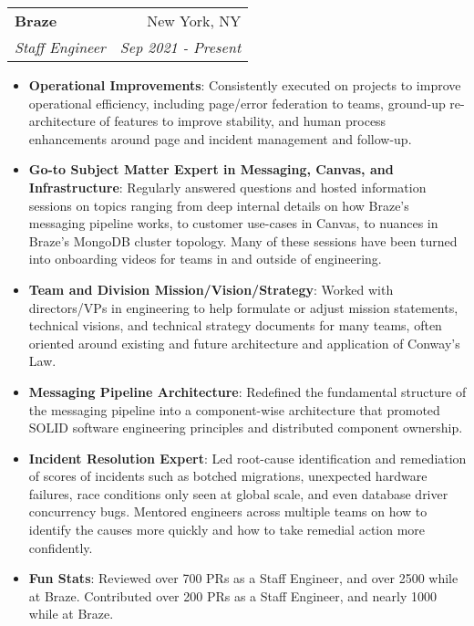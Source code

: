 \documentclass[letterpaper,10pt]{article}
\makeatletter
\newcommand{\resumeItem}[2]{
  \item\small{
    \textbf{#1}{: #2 \vspace{-2pt}}
  }
}
\newcommand{\resumeSubheading}[4]{
  \vspace{-1pt}\item
    \begin{tabular*}{0.97\textwidth}[t]{l@{\extracolsep{\fill}}r}
      \textbf{#1} & #2 \\
      \textit{\small#3} & \textit{\small #4} \\
    \end{tabular*}\vspace{-5pt}
}
\newcommand{\resumeItemListStart}{\begin{itemize}}
\newcommand{\resumeItemListEnd}{\end{itemize}\vspace{-5pt}}
\makeatother
\begin{document}
    \resumeSubheading
      {Braze}{New York, NY}
      {Staff Engineer}{Sep 2021 - Present}
       \resumeItemListStart
        \resumeItem{Operational Improvements}
          {Consistently executed on projects to improve operational efficiency, including page/error federation to teams, ground-up re-architecture of features to improve stability, and human process enhancements around page and incident management and follow-up.}
        \resumeItem{Go-to Subject Matter Expert in Messaging, Canvas, and Infrastructure}
          {Regularly answered questions and hosted information sessions on topics ranging from deep internal details on how Braze's messaging pipeline works, to customer use-cases in Canvas, to nuances in Braze's MongoDB cluster topology. Many of these sessions have been turned into onboarding videos for teams in and outside of engineering.}
        \resumeItem{Team and Division Mission/Vision/Strategy}
          {Worked with directors/VPs in engineering to help formulate or adjust mission statements, technical visions, and technical strategy documents for many teams, often oriented around existing and future architecture and application of Conway's Law.}
        \resumeItem{Messaging Pipeline Architecture}
          {Redefined the fundamental structure of the messaging pipeline into a component-wise architecture that promoted SOLID software engineering principles and distributed component ownership.}
        \resumeItem{Incident Resolution Expert}
          {Led root-cause identification and remediation of scores of incidents such as botched migrations, unexpected hardware failures, race conditions only seen at global scale, and even database driver concurrency bugs. Mentored engineers across multiple teams on how to identify the causes more quickly and how to take remedial action more confidently.}
        \resumeItem{Fun Stats}
          {Reviewed over 700 PRs as a Staff Engineer, and over 2500 while at Braze. Contributed over 200 PRs as a Staff Engineer, and nearly 1000 while at Braze.}
      \resumeItemListEnd
\end{document}
